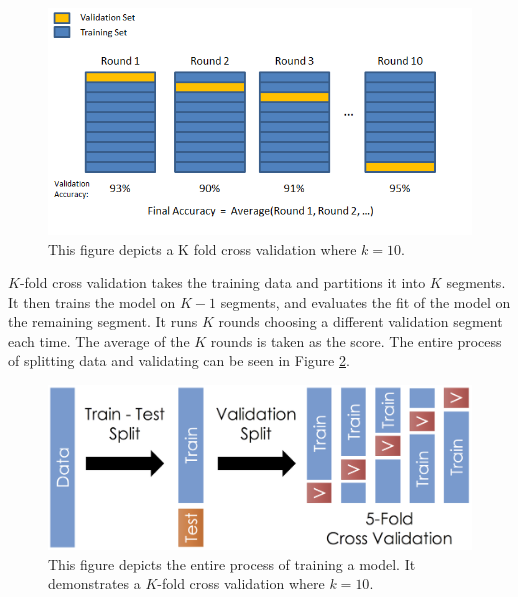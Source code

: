 \documentclass[12pt]{article}
\begin{document}
\begin{figure}[ht]
	\centering
	\includegraphics[width=.5\textwidth]{kfold.png}
	\caption{This figure depicts a K fold cross validation where $k=10$. \cite{kfold}}
	\label{kfold}
\end{figure}

$K$-fold cross validation takes the training data and partitions it into $K$ segments. It then trains the model on $K-1$ segments, and evaluates the fit of the model on the remaining segment. It runs $K$ rounds choosing a different validation segment each time. The average of the $K$ rounds is taken as the score. The entire process of splitting data and validating can be seen in Figure \ref{test_train_validate}.

\begin{figure}[ht]
	\centering
	\includegraphics[width=.5\textwidth]{test_train_validate.png}
	\caption{This figure depicts the entire process of training a model. It demonstrates a $K$-fold cross validation where $k=10$. \cite{kfold2}}
	\label{test_train_validate}
\end{figure}

\clearpage 


\end{document}

